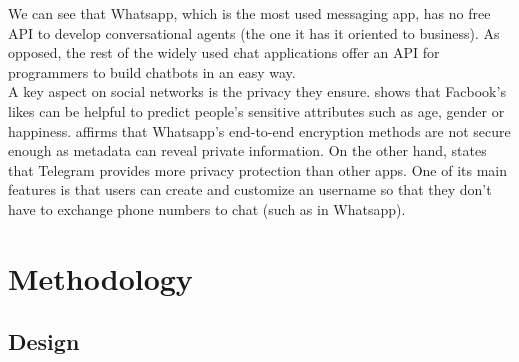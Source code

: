 \documentclass[12pt,english]{article}
\begin{document}
We can see that Whatsapp, which is the most used messaging app, has no free API to develop conversational agents (the one it has it oriented to business). As opposed, the rest of the widely used chat applications offer an API for programmers to build chatbots in an easy way. \\

A key aspect on social networks is the privacy they ensure. \cite{Kosinski5802} shows that Facbook's likes can be helpful to predict people's sensitive attributes such as age, gender or happiness. \cite{Rastogi17} affirms that Whatsapp's end-to-end encryption methods are not secure enough as metadata can reveal private information. On the other hand, \cite{Sutikno16} states that Telegram provides more privacy protection than other apps. One of its main features is that users can create and customize an username so that they don't have to exchange phone numbers to chat (such as in Whatsapp).


\newpage

\section{Methodology}

\subsection{Design}
\end{document}
